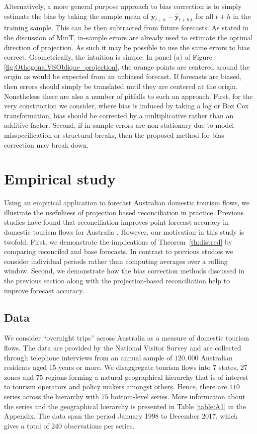 \documentclass[12pt]{article}
\theoremstyle{definition}
\begin{document}
	Alternatively, a more general purpose approach to bias correction is to simply estimate the bias by taking the sample mean of $\bm{y
	}_{t+h}-\hat{\bm{y}}_{t+h|t}$ for all $t+h$ in the training sample.  This can be then subtracted from future forecasts.  As stated in the discussion of MinT, in-sample errors are already used to estimate the optimal direction of projection.  As such it may be possible to use the same errors to bias correct.  Geometrically, the intuition is simple.  In panel (a) of Figure \ref{fig:OthogonalVSOblique_projection}, the orange points are centered around the origin as would be expected from an unbiased forecast.  If forecasts are biased, then errors should simply be translated until they are centered at the origin.  Nonetheless there are also a number of pitfalls to such an approach.  First, for the very construction we consider, where bias is induced by taking a log or Box Cox transformation, bias should be corrected by a multiplicative rather than an additive factor.  Second, if in-sample errors are non-stationary due to model misspecification or structural breaks, then the proposed method for bias correction may break down.
	
	\section{Empirical study} \label{sec:EmpStudy}
	
	
	Using an empirical application to forecast Australian domestic tourism flows, we illustrate the usefulness of projection based reconciliation in practice. Previous studies have found that reconciliation improves point forecast accuracy in domestic tourism flows for Australia \citep[see for example][]{Athanasopoulos2009, Hyndman2011,WicEtAl2019}. However, our motivation in this study is twofold.  First, we demonstrate the implications of Theorem~\ref{th:distred} by comparing reconciled and base forecasts. In contrast to previous studies we consider individual periods rather than computing averages over a rolling window.  Second, we demonstrate how the bias correction methods discussed in the previous section along with the projection-based reconciliation help to improve forecast accuracy.
	
	
	\subsection{Data}
	
	We consider ``overnight trips'' across Australia as a measure of domestic tourism flows. The data are provided by the National Visitor Survey and are collected through telephone interviews from an annual sample of $120,000$ Australian residents aged $15$ years or more. We disaggregate tourism flows into 7 states, 27 zones and 75 regions forming a natural geographical hierarchy that is of interest to tourism operators and policy makers amongst others. Hence, there are $110$ series across the hierarchy with $75$ bottom-level series. More information about the series and the geographical hierarchy is presented in Table \ref{table:A1} in the Appendix. The data span the period January 1998 to December 2017, which gives a total of $240$ observations per series.
\end{document}
